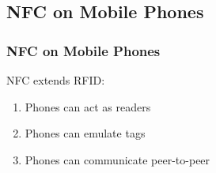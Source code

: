 \documentclass[unknownkeysallowed]{beamer}
\begin{document}



\subsection{NFC on Mobile Phones}

\begin{frame}
\frametitle{NFC on Mobile Phones}
  \begin{center}
  \begin{minipage}{.7\textwidth}
  \begin{block}{NFC extends RFID:}
		\begin{enumerate}
		  \item{Phones can act as readers}
		  \item{Phones can emulate tags}
      \item{Phones can communicate peer-to-peer}
   	\end{enumerate}
  \end{block}
  \end{minipage}
  \end{center}
\end{frame}
\end{document}
